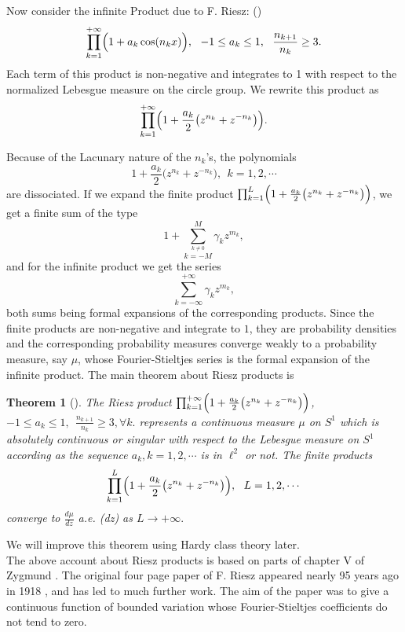 \documentclass{amsart}
\newtheorem{Th}{Theorem}[section]
\theoremstyle{definition}
\theoremstyle{remark}
\numberwithin{equation}{section}
\newcommand{\1}{\mathbb{1}}
\begin{document}
Now consider the infinite Product due to F. Riesz:  (\cite[p.208]{Zygmund})
$$\prod_{k=1}^{+\infty} \Bigl(1+a_k \cos(n_k x)\Bigr),~~-1\leq a_k \leq
1,~~\frac{n_{k+1}}{n_k} \geq 3.$$
Each term of this product is non-negative and integrates to 1 with respect to the normalized Lebesgue measure on the circle group. We rewrite this product as
$$\prod_{k=1}^{+\infty} \Bigl(1+\frac{a_k}2 \bigl(z^{n_k}+z^{-n_k}\bigr) \Bigr). $$

Because of the Lacunary nature of the $n_k$'s, the polynomials
$$1+\frac{a_k}2 \bigl(z^{n_k}+z^{-n_k}\bigr),~~k=1,2,\cdots$$
are dissociated. If we expand the finite product $\prod_{k=1}^{L} \Bigl(1+\frac{a_k}2 \bigl(z^{n_k}+z^{-n_k}\bigr) \Bigr)$, we get a finite sum of the type
$$1+\sum_{\overset{k \neq 0}{k=-M}}^{M}\gamma_k z^{m_k},$$
and for the infinite product we get the series
$$\sum_{k=-\infty}^{+\infty}\gamma_k z^{m_k},$$
both sums being formal expansions of the corresponding products. Since the finite products are non-negative and integrate to $1$, they are probability densities and the corresponding probability measures converge weakly to a probability measure, say $\mu$, whose Fourier-Stieltjes series is the formal expansion of the infinite product. The main theorem about Riesz products is
\begin{Th}[{\cite[p.209]{Zygmund}}]\label{zyg2}
The Riesz product $\prod_{k=1}^{+\infty} \Bigl(1+\frac{a_k}2 \bigl(z^{n_k}+z^{-n_k}\bigr) \Bigr)$, $-1 \leq a_k \leq 1,~~\frac{n_{k+1}}{n_k} \geq 3, \forall k.$ represents a continuous measure $\mu$ on $S^1$ which is absolutely continuous or singular with respect to the Lebesgue measure on $S^1$ according as the sequence $a_k,k=1,2,\cdots$ is in $\ell^2$ or not. The finite products
$$\prod_{k=1}^{L} \Bigl(1+\frac{a_k}2 \bigl(z^{n_k}+z^{-n_k}\bigr) \Bigr),~~L=1,2,\cdots$$ converge to $\frac{d\mu}{dz}$ a.e. (dz) as $L \longrightarrow +\infty.$
\end{Th}

We will improve this theorem using Hardy class theory later.\\

The above account about Riesz products is based on parts of chapter V of Zygmund \cite{Zygmund}. The original four page paper of F. Riesz appeared nearly 95 years ago in 1918 \cite{Riesz}, and has led to much further work. The aim of the paper was to give a continuous function of bounded variation whose Fourier-Stieltjes coefficients do not tend to zero.\\
\end{document}
